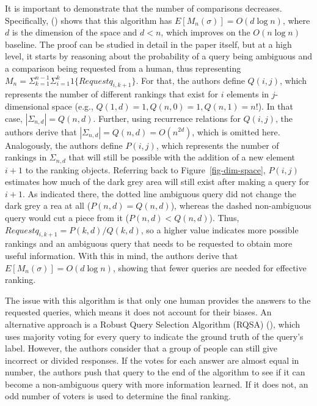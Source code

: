 \documentclass[
  letterpaper,
  numbers=noenddot,
  DIV=11]{scrreprt}
\theoremstyle{definition}
\theoremstyle{plain}
\theoremstyle{plain}
\theoremstyle{remark}
\begin{document}
It is important to demonstrate that the number of comparisons decreases.
Specifically, () shows that
this algorithm has \(E[M_n(\sigma)] = O(d\log n)\), where \(d\) is the
dimension of the space and \(d < n\), which improves on the
\(O(n\log n)\) baseline. The proof can be studied in detail in the paper
itself, but at a high level, it starts by reasoning about the
probability of a query being ambiguous and a comparison being requested
from a human, thus representing
\(M_n = \Sigma_{k=1}^{n-1}\Sigma_{i=1}^k 1\{Requestq_{i,k+1}\}\). For
that, the authors define \(Q(i,j)\), which represents the number of
different rankings that exist for \(i\) elements in \(j\)-dimensional
space (e.g., \(Q(1,d) = 1, Q(n,0) = 1, Q(n,1) = n!\)). In that case,
\(|\Sigma_{n,d}| = Q(n,d)\). Further, using recurrence relations for
\(Q(i,j)\), the authors derive that
\(|\Sigma_{n,d}| = Q(n,d) = O(n^{2d})\), which is omitted here.
Analogously, the authors define \(P(i,j)\), which represents the number
of rankings in \(\Sigma_{n,d}\) that will still be possible with the
addition of a new element \(i+1\) to the ranking objects. Referring back
to Figure~\ref{fig-dim-space}, \(P(i,j)\) estimates how much of the dark
grey area will still exist after making a query for \(i+1\). As
indicated there, the dotted line ambiguous query did not change the dark
grey a rea at all (\(P(n,d) = Q(n,d)\)), whereas the dashed
non-ambiguous query would cut a piece from it (\(P(n,d) < Q(n,d)\)).
Thus, \(Request q_{i,k+1} = P(k,d) / Q(k,d)\), so a higher value
indicates more possible rankings and an ambiguous query that needs to be
requested to obtain more useful information. With this in mind, the
authors derive that \(E[M_n(\sigma)] = O(d\log n)\), showing that fewer
queries are needed for effective ranking.

The issue with this algorithm is that only one human provides the
answers to the requested queries, which means it does not account for
their biases. An alternative approach is a Robust Query Selection
Algorithm (RQSA) (), which
uses majority voting for every query to indicate the ground truth of the
query's label. However, the authors consider that a group of people can
still give incorrect or divided responses. If the votes for each answer
are almost equal in number, the authors push that query to the end of
the algorithm to see if it can become a non-ambiguous query with more
information learned. If it does not, an odd number of voters is used to
determine the final ranking.
\end{document}
